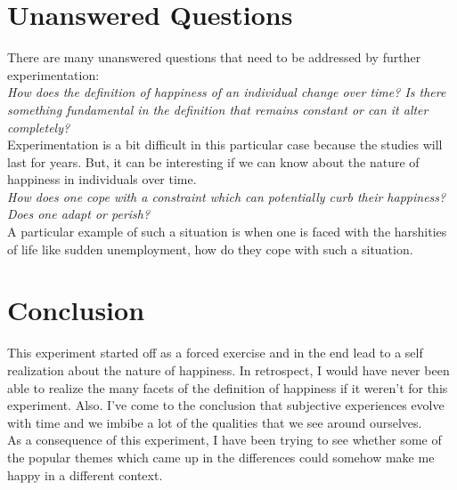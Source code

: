 \documentclass[twoside]{article}
\begin{document}
\begin{multicols}{2}

\section{Unanswered Questions}
There are many unanswered questions that need to be addressed by further experimentation:\\

\noindent \emph{How does the definition of happiness of an individual change over time? Is there something 
fundamental in the definition that remains constant or can it alter completely?}\\
Experimentation is a bit difficult in this particular case because the studies will last for years. But,
it can be interesting if we can know about the nature of happiness in individuals over time.\\

\noindent \emph{How does one cope with a constraint which can potentially curb their happiness? Does one adapt or 
perish?}\\
A particular example of such a situation is when one is faced with the harshities of life like sudden
unemployment, how do they cope with such a situation.


\section{Conclusion}
This experiment started off as a forced exercise and in the end lead to a self realization about the nature of
happiness. In retrospect, I would have never been able to realize the many facets of the definition of 
happiness if it weren't for this experiment. Also. I've come to the conclusion that subjective experiences
evolve with time and we imbibe a lot of the qualities that we see around ourselves. \\
As a consequence of this experiment, I have been trying to see whether some of the popular themes which
came up in the differences could somehow make me happy in a different context.

\end{multicols}
\end{document}
